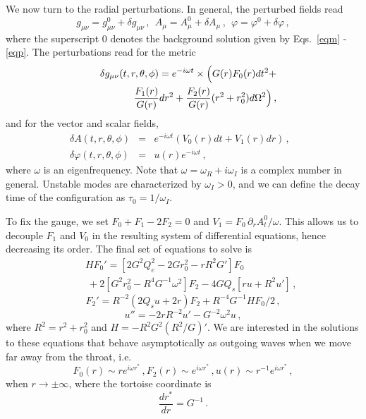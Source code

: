 \documentclass[floats,floatfix,showpacs,amssymb,prd,superscriptaddress,nofootinbib,nolongbibliography,reprint]{revtex4-2}
\newcommand\prlsec[1]{\vspace{2mm}\noindent {\textbf{  \textit{#1}}}}
\begin{document}
\prlsec{Radial perturbations.}
We now turn to the radial perturbations.
In general, the perturbed fields read
\begin{equation}
    g_{\mu\nu}=g_{\mu\nu}^0+\delta g_{\mu\nu} \, ,
    \ \ 
%
    A_{\mu}=A_{\mu}^0+\delta A_{\mu} \,,
    \ \ 
%
    \varphi=\varphi^0+\delta\varphi \,,
\end{equation}
where the superscript $0$ denotes the background solution given by Eqs.~\eqref{eqm} - \eqref{eqp}.
The perturbations
read for the metric
\begin{eqnarray}
 && \delta g_{\mu\nu}(t,r,\theta,\phi)= e^{-i\omega t} \times
 \Bigl(
 G(r)F_0(r) dt^2 + 
 \nonumber \\
 &&  
 \frac{F_1(r)}{G(r)} dr^2 + \frac{F_2(r)}{G(r)} (r^2+r_0^2)d\Omega^2  
 \Bigl) \, ,
\end{eqnarray}
%
and for the vector and scalar fields,
\begin{eqnarray}\label{deltaA_polar}
\delta A(t,r,\theta,\phi)&=& e^{-i\omega t} \left( V_0(r)dt  
+ V_1(r)dr   
\right) \, ,
\ \ \ \\
\delta\varphi(t,r,\theta,\phi)&=&u(r)e^{-i\omega t} \, ,
\end{eqnarray}
where $\omega$ is an eigenfrequency.
Note that $\omega=\omega_R+i\omega_I$ is a complex number in general. Unstable modes are characterized by $\omega_I>0$, and we can define the decay time of the configuration as $\tau_0=1/\omega_I$.

To fix the gauge, we set $F_0+F_1-2F_2=0$  
and $V_1 = F_0 \, \partial_r A_t^0/\omega$.
This allows us to decouple $F_1$ and $V_0$ 
in
the resulting system of differential equations, 
hence
decreasing its order.
The final set of equations to solve is
\begin{eqnarray}\label{eq_F0_radial}
 &&  H F_0' =  \left[ 2G^2Q_e^2 - 2Gr_0^2 - rR^2G'\right] F_0 \\
 && \:   +    2\left[ G^2 r_0^2 - 
 R^4 G^{-1}
 \omega^2 \right] F_2  -4G Q_s \left[ ru + R^2 u' \right] \, ,  \nonumber
\end{eqnarray}
\begin{equation}\label{eq_F2_radial}
   F_2'=
% 
    R^{-2}(2 Q_s u + 2 r) F_2
% 
   + R^{-4}G^{-1} H F_0 /2 \, ,
\end{equation}
\begin{equation}\label{eq_u_radial}
% 
    u''=-2rR^{-2}u'-G^{-2}\omega^2 u \, ,    
\end{equation}
%
where $R^2=r^2+r_0^2$ and $H=-R^2G^2(R^2/G)'$.
We are interested in the solutions 
to
these equations that behave asymptotically as outgoing waves when we move far away from the throat, 
i.e.
\begin{equation}
 {   F_0(r) \sim re^{i\omega r^*}\,, F_2(r) \sim e^{i\omega r^*}\,, u(r) \sim 
 r^{-1}
 e^{i\omega r^*}\,,  }
\end{equation}
%
when $r\to\pm\infty$,
where the tortoise coordinate is
\begin{equation}\label{tortoise}
    \frac{dr^*}{dr}=
%
G^{-1}\, .
\end{equation}
\end{document}
